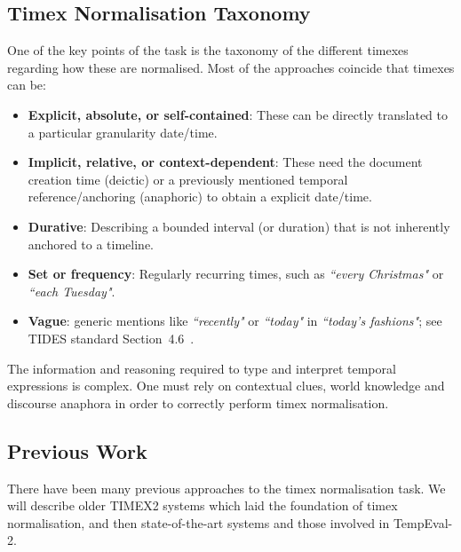 \documentclass[10pt, a4paper]{article}
\begin{document}
\subsection{Timex Normalisation Taxonomy}

One of the key points of the task is the taxonomy of the different timexes regarding how these are normalised.
Most of the approaches coincide that timexes can be:

\begin{itemize}
\item \textbf{Explicit, absolute, or self-contained}: These can be directly translated to a particular granularity date/time.
\item \textbf{Implicit, relative, or context-dependent}: These need the document creation time (deictic) or a previously mentioned temporal reference/anchoring (anaphoric) to obtain a explicit date/time.
\item \textbf{Durative}: Describing a bounded interval (or duration) that is not inherently anchored to a timeline.
\item \textbf{Set or frequency}: Regularly recurring times, such as \emph{``every Christmas"} or \emph{``each Tuesday"}.
\item \textbf{Vague}: generic mentions like \emph{``recently"} or \emph{``today"} in \emph{``today's fashions"}; see TIDES standard Section~4.6~\cite{Ferro2005TIDES}.
\end{itemize}

The information and reasoning required to type and interpret temporal expressions is complex. One must rely on contextual clues, world knowledge and discourse anaphora in order to correctly perform timex normalisation.


\subsection{Previous Work}
\label{previous}

There have been many previous approaches to the timex normalisation task. We will describe older TIMEX2 systems which laid the foundation of timex normalisation, and then state-of-the-art systems and those involved in TempEval-2.

\end{document}
